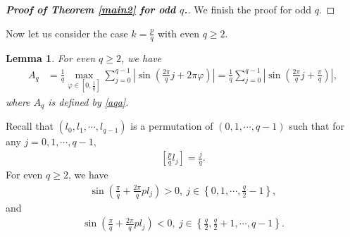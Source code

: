 \documentclass[12pt]{amsart}
\newcommand{\abs}[1]{\left\lvert #1 \right\rvert}
\theoremstyle{plain}
\newtheorem{lemma}[theorem]{Lemma}
\theoremstyle{definition}
\begin{document}
\begin{proof}[\textbf{Proof of Theorem \ref{main2} for odd $q$.}]
		We finish the proof for odd $q.$
		
	\end{proof}	
	
	Now let us consider the case $k=\frac{p}{q}$ with even $q\geq2$. 
	
	\begin{lemma}\cite[Lemma 3.3]{LiuDiscrete}
\label{l44} For even $q\geq2$, we have
		\begin{align}
			A_q&=\frac{1}{q}\max_{\varphi\in \left[0,\frac{1}{q}\right]}\sum_{j=0}^{q-1}\abs{\sin\left(\frac{2\pi}{q}j+2\pi\varphi\right)}=\frac{1}{q}\sum_{j=0}^{q-1}\abs{\sin\left(\frac{2\pi}{q}j+\frac{\pi}{q}\right)},\nonumber
		\end{align}
where $A_q$ is defined by \eqref{aqa}. 
	\end{lemma}
Recall that $(l_0,l_1,\cdots, l_{q-1})$ is a permutation of $(0,1,\cdots,q-1)$ such that for any $j=0,1,\cdots,q-1,$ 
\begin{align}
	\left[\frac{p}{q}l_j\right]=\frac{j}{q}.\nonumber
\end{align} For even $q\geq 2$,
we have
\begin{align}
\sin\left(\frac{\pi}{q}+\frac{2\pi}{q}pl_j\right)>0,\ j\in\left\{0,1,\cdots,\frac{q}{2}-1\right\},\label{sgz}
\end{align}
and
\begin{align}
\sin\left(\frac{\pi}{q}+\frac{2\pi}{q}pl_j\right)<0,\ j\in\left\{\frac{q}{2},\frac{q}{2}+1,\cdots,q-1\right\}.\label{slz}
\end{align}
\end{document}
